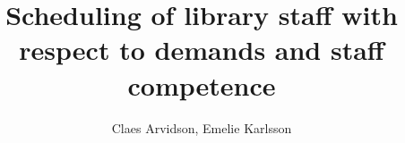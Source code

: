 \documentclass[a4paper, 10pt, twoside, openright]{book}
\newcommand{\putauthor}[0]{Claes Arvidson, Emelie Karlsson}
\newcommand{\puttitle}[0]{Scheduling of library staff with respect to demands and staff competence}
\begin{document}
 

\frontmatter

\newcommand{\ala}[0]{{\alpha}_{1}}
\newcommand{\alb}[0]{{\alpha}_{2}}
\newcommand{\nc}[0]{{N}_{C}}
\newcommand{\tCh}[0]{the Chemostat }
\newcommand{\Ch}[0]{Chemostat }
\newcommand{\ch}[0]{chemostat }
\newcommand{\MMk}[0]{Michaelis-Menten kinetics }
\newcommand{\KI}[0]{{K}_{I} }
\newcommand{\KN}[0]{{K}_{N} }
\newcommand{\mmu}[0]{{\mu}_{max} }
\newcommand{\KMAX}[0]{\mmu}
\newcommand{\AAA}[0]{\mathbf{A} }
\newcommand{\enc}[0]{utf8}

\title{\puttitle}
\author{\putauthor}

\end{document}
